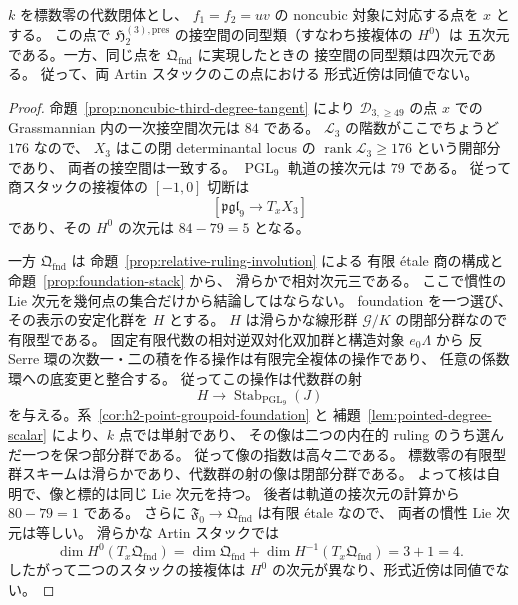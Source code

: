 \begin{proposition}[二根対一致点での一次変形の相違]
\label{prop:truncated-versus-foundation-tangent}
$k$ を標数零の代数閉体とし、
$f_1=f_2=uv$ の noncubic 対象に対応する点を $x$ とする。
この点で $\mathfrak H_2^{(3),\mathrm{pres}}$
の接空間の同型類（すなわち接複体の $H^0$）は
五次元である。一方、同じ点を
$\mathfrak Q_{\mathrm{fnd}}$ に実現したときの
接空間の同型類は四次元である。
従って、両 Artin スタックのこの点における
形式近傍は同値でない。
\end{proposition}
\begin{proof}
命題~\ref{prop:noncubic-third-degree-tangent} により
$\mathcal D_{3,\ge49}$ の点 $x$ での
Grassmannian 内の一次接空間次元は $84$ である。
$\mathcal L_3$ の階数がここでちょうど $176$ なので、
$X_3$ はこの閉 determinantal locus の
$\operatorname{rank}\mathcal L_3\ge176$ という開部分であり、
両者の接空間は一致する。
$\operatorname{PGL}_9$ 軌道の接次元は $79$ である。
従って商スタックの接複体の $[-1,0]$ 切断は
\[
 [\mathfrak{pgl}_9\longrightarrow T_xX_3]
\]
であり、その $H^0$ の次元は $84-79=5$ となる。

一方 $\mathfrak Q_{\mathrm{fnd}}$ は
命題~\ref{prop:relative-ruling-involution} による
有限 \'etale 商の構成と
命題~\ref{prop:foundation-stack} から、
滑らかで相対次元三である。
ここで慣性の Lie 次元を幾何点の集合だけから結論してはならない。
foundation を一つ選び、その表示の安定化群を $H$ とする。
$H$ は滑らかな線形群 $\mathcal G/K$ の閉部分群なので有限型である。
固定有限代数の相対逆双対化双加群と構造対象 $e_0\Lambda$ から
反 Serre 環の次数一・二の積を作る操作は有限完全複体の操作であり、
任意の係数環への底変更と整合する。
従ってこの操作は代数群の射
\[
 H\longrightarrow\operatorname{Stab}_{\operatorname{PGL}_9}(J)
\]
を与える。系~\ref{cor:h2-point-groupoid-foundation} と
補題~\ref{lem:pointed-degree-scalar} により、$k$ 点では単射であり、
その像は二つの内在的 ruling のうち選んだ一つを保つ部分群である。
従って像の指数は高々二である。
標数零の有限型群スキームは滑らかであり、代数群の射の像は閉部分群である。
よって核は自明で、像と標的は同じ Lie 次元を持つ。
後者は軌道の接次元の計算から $80-79=1$ である。
さらに $\mathfrak F_0\to\mathfrak Q_{\mathrm{fnd}}$ は有限 \'etale なので、
両者の慣性 Lie 次元は等しい。
滑らかな Artin スタックでは
\[
 \dim H^0(T_x\mathfrak Q_{\mathrm{fnd}})
 =\dim\mathfrak Q_{\mathrm{fnd}}
  +\dim H^{-1}(T_x\mathfrak Q_{\mathrm{fnd}})
 =3+1=4.
\]
したがって二つのスタックの接複体は
$H^0$ の次元が異なり、形式近傍は同値でない。
\end{proof}

